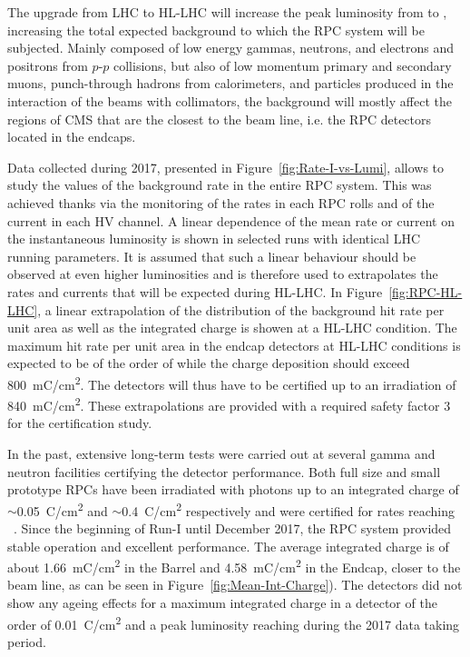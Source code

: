 	The upgrade from LHC to HL-LHC will increase the peak luminosity from  \siflux to  \siflux, increasing the total expected background to which the RPC system will be subjected. Mainly composed of low energy gammas, neutrons, and electrons and positrons from $p$-$p$ collisions, but also of low momentum primary and secondary muons, punch-through hadrons from calorimeters, and particles produced in the interaction of the beams with collimators, the background will mostly affect the regions of CMS that are the closest to the beam line, i.e. the RPC detectors located in the endcaps.

	Data collected during 2017, presented in Figure~\ref{fig:Rate-I-vs-Lumi}, allows to study the values of the background rate in the entire RPC system. This was achieved thanks via the monitoring of the rates in each RPC rolls and of the current in each HV channel. A linear dependence of the mean rate or current on the instantaneous luminosity is shown in selected runs with identical LHC running parameters. It is assumed that such a linear behaviour should be observed at even higher luminosities and is therefore used to extrapolates the rates and currents that will be expected during HL-LHC. In Figure~\ref{fig:RPC-HL-LHC}, a linear extrapolation of the distribution of the background hit rate per unit area as well as the integrated charge is showen at a HL-LHC condition. The maximum hit rate per unit area in the endcap detectors at HL-LHC conditions is expected to be of the order of  while the charge deposition should exceed \SI{800}{mC/cm^2}. The detectors will thus have to be certified up to an irradiation of \SI{840}{mC/cm^2}. These extrapolations are provided with a required safety factor 3 for the certification study.

	In the past, extensive long-term tests were carried out at several gamma and neutron facilities certifying the detector performance. Both full size and small prototype RPCs have been irradiated with photons up to an integrated charge of $\sim$\SI{0.05}{C/cm^2} and $\sim$\SI{0.4}{C/cm^2} respectively and were certified for rates reaching ~\cite{GIF2004,AGING2009}. Since the beginning of Run-I until December 2017, the RPC system provided stable operation and excellent performance. The average integrated charge is of about \SI{1.66}{mC/cm^2} in the Barrel and \SI{4.58}{mC/cm^2} in the Endcap, closer to the beam line, as can be seen in Figure~\ref{fig:Mean-Int-Charge}). The detectors did not show any ageing effects for a maximum integrated charge in a detector of the order of \SI{0.01}{C/cm^2} and a peak luminosity reaching  \siflux during the 2017 data taking period.

